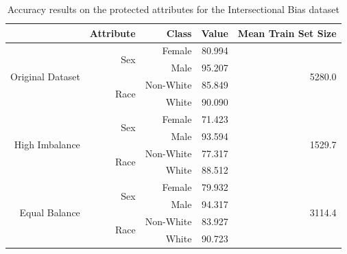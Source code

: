 \documentclass[12pt]{article}
\begin{document}
\begin{table}[]
  \centering
  \begin{tabular}{@{}rrrrr@{}}
  \toprule
                                    & Attribute             & Class     & Value  & Mean Train Set Size     \\ \midrule
  \multirow{4}{*}{Original Dataset} & \multirow{2}{*}{Sex}  & Female    & 80.994 & \multirow{4}{*}{5280.0} \\
                                    &                       & Male      & 95.207 &                         \\
                                    & \multirow{2}{*}{Race} & Non-White & 85.849 &                         \\
                                    &                       & White     & 90.090 &                         \\ \midrule
  \multirow{4}{*}{High Imbalance}   & \multirow{2}{*}{Sex}  & Female    & 71.423 & \multirow{4}{*}{1529.7} \\
                                    &                       & Male      & 93.594 &                         \\
                                    & \multirow{2}{*}{Race} & Non-White & 77.317 &                         \\
                                    &                       & White     & 88.512 &                         \\ \midrule
  \multirow{4}{*}{Equal Balance}    & \multirow{2}{*}{Sex}  & Female    & 79.932 & \multirow{4}{*}{3114.4} \\
                                    &                       & Male      & 94.317 &                         \\
                                    & \multirow{2}{*}{Race} & Non-White & 83.927 &                         \\
                                    &                       & White     & 90.723 &                         \\ \bottomrule
  \end{tabular}
  \caption{Accuracy results on the protected attributes for the Intersectional Bias dataset}
  \label{tab:acc-intersectional}
\end{table}
\end{document}

